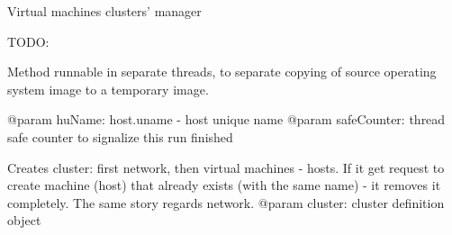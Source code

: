 \documentclass[letterpaper,10pt,english]{sphinxmanual}
\begin{document}
\begin{fulllineitems}
\label{ref-manual/XrdTest:XrdTest.ClusterManager.ClusterManager}
Virtual machines clusters' manager

\begin{fulllineitems}
\label{ref-manual/XrdTest:XrdTest.ClusterManager.ClusterManager.attachDisk}
TODO:

\end{fulllineitems}


\begin{fulllineitems}
\label{ref-manual/XrdTest:XrdTest.ClusterManager.ClusterManager.attachDisks}
\end{fulllineitems}


\begin{fulllineitems}
\label{ref-manual/XrdTest:XrdTest.ClusterManager.ClusterManager.copyImg}
Method runnable in separate threads, to separate copying of source
operating system image to a temporary image.

@param huName: host.uname - host unique name
@param safeCounter: thread safe counter to signalize this run finished

\end{fulllineitems}


\begin{fulllineitems}
\label{ref-manual/XrdTest:XrdTest.ClusterManager.ClusterManager.createCluster}
Creates cluster: first network, then virtual machines - hosts.
If it get request to create machine (host) that already exists (with the
same name) - it removes it completely. The same story regards network.
@param cluster: cluster definition object

\end{fulllineitems}


\end{fulllineitems}
\end{document}
